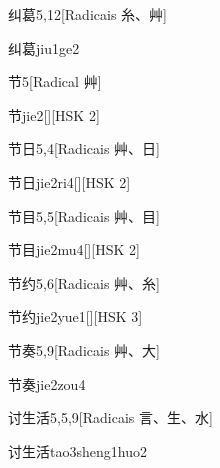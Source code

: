 \begin{entry}{纠葛}{5,12}[Radicais ⽷、⾋]
  \begin{phonetics}{纠葛}{jiu1ge2}
  \end{phonetics}
\end{entry}

\begin{entry}{节}{5}[Radical ⾋]
  \begin{phonetics}{节}{jie2}[][HSK 2]
  \end{phonetics}
\end{entry}

\begin{entry}{节日}{5,4}[Radicais ⾋、⽇]
  \begin{phonetics}{节日}{jie2ri4}[][HSK 2]
  \end{phonetics}
\end{entry}

\begin{entry}{节目}{5,5}[Radicais ⾋、⽬]
  \begin{phonetics}{节目}{jie2mu4}[][HSK 2]
  \end{phonetics}
\end{entry}

\begin{entry}{节约}{5,6}[Radicais ⾋、⽷]
  \begin{phonetics}{节约}{jie2yue1}[][HSK 3]
  \end{phonetics}
\end{entry}

\begin{entry}{节奏}{5,9}[Radicais ⾋、⼤]
  \begin{phonetics}{节奏}{jie2zou4}
  \end{phonetics}
\end{entry}

\begin{entry}{讨生活}{5,5,9}[Radicais ⾔、⽣、⽔]
  \begin{phonetics}{讨生活}{tao3sheng1huo2}
  \end{phonetics}
\end{entry}

